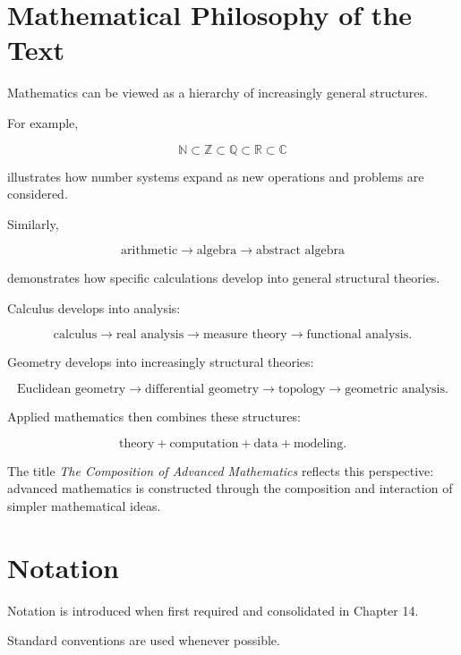 \section*{Mathematical Philosophy of the Text}

Mathematics can be viewed as a hierarchy of increasingly general structures.

For example,

\[
\boxed{
\mathbb{N}
\subset
\mathbb{Z}
\subset
\mathbb{Q}
\subset
\mathbb{R}
\subset
\mathbb{C}
}
\]

illustrates how number systems expand as new operations and problems are
considered.

Similarly,

\[
\boxed{
\text{arithmetic}
\rightarrow
\text{algebra}
\rightarrow
\text{abstract algebra}
}
\]

demonstrates how specific calculations develop into general structural
theories.

Calculus develops into analysis:

\[
\boxed{
\text{calculus}
\rightarrow
\text{real analysis}
\rightarrow
\text{measure theory}
\rightarrow
\text{functional analysis}.
}
\]

Geometry develops into increasingly structural theories:

\[
\boxed{
\text{Euclidean geometry}
\rightarrow
\text{differential geometry}
\rightarrow
\text{topology}
\rightarrow
\text{geometric analysis}.
}
\]

Applied mathematics then combines these structures:

\[
\boxed{
\text{theory}
+
\text{computation}
+
\text{data}
+
\text{modeling}.
}
\]

The title \emph{The Composition of Advanced Mathematics} reflects this
perspective: advanced mathematics is constructed through the composition
and interaction of simpler mathematical ideas.

\section*{Notation}

Notation is introduced when first required and consolidated in
Chapter 14.

Standard conventions are used whenever possible.

